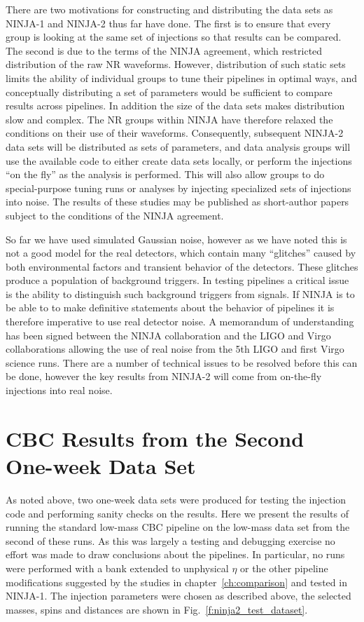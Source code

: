 There are two motivations for constructing and distributing the data
sets as NINJA-1 and NINJA-2 thus far have done.  The first is to
ensure that every group is looking at the same set of injections so
that results can be compared.  The second is due to the terms of the
NINJA agreement, which restricted distribution of the raw NR
waveforms.  However, distribution of such static sets limits the
ability of individual groups to tune their pipelines in optimal ways,
and conceptually distributing a set of parameters would be sufficient
to compare results across pipelines.  In addition the size of the data
sets makes distribution slow and complex.  The NR groups within NINJA
have therefore relaxed the conditions on their use of their waveforms.
Consequently, subsequent NINJA-2 data sets will be distributed as sets
of parameters, and data analysis groups will use the available code to
either create data sets locally, or perform the injections ``on the
fly'' as the analysis is performed.  This will also allow groups to do
special-purpose tuning runs or analyses by injecting specialized 
sets of injections into noise.  The results of these studies may be
published as short-author papers subject to the conditions of the
NINJA agreement.

So far we have used simulated Gaussian noise, however as we have noted
this is not a good model for the real detectors, which contain many
``glitches'' caused by both environmental factors and transient
behavior of the detectors.  These glitches produce a population of
background triggers.  In testing pipelines a critical issue is the
ability to distinguish such background triggers from signals.  If
NINJA is to be able to to make definitive statements about the
behavior of pipelines it is therefore imperative to use real detector
noise.  A memorandum of understanding has been signed between the
NINJA collaboration and the LIGO and Virgo collaborations allowing the
use of real noise from the 5th LIGO and first Virgo science runs.
There are a number of technical issues to be resolved before this can
be done, however the key results from NINJA-2 will come from
on-the-fly injections into real noise.

\section{CBC Results from the Second One-week Data Set}
\label{sec:ninja2_test_week}

As noted above, two one-week data sets were produced for testing the
injection code and performing sanity checks on the results.  Here we
present the results of running the standard low-mass CBC pipeline on
the low-mass data set from the second of these runs.  As this was
largely a testing and debugging exercise no effort was made to draw
conclusions about the pipelines.  In particular, no runs were
performed with a bank extended to unphysical $\eta$ or the other
pipeline modifications suggested by the studies in
chapter~\ref{ch:comparison} and tested in NINJA-1.  The injection
parameters were chosen as described above, the selected masses, spins
and distances are shown in Fig.~\ref{f:ninja2_test_dataset}.

